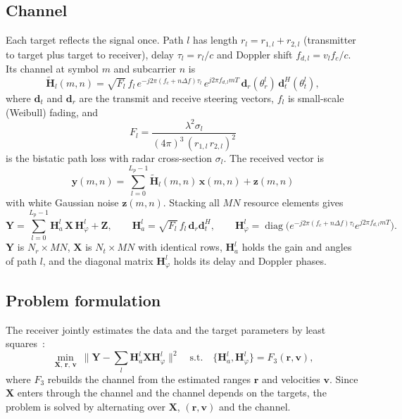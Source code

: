 \documentclass[11pt,a4paper]{article}
\newcommand{\BH}{\mathbf{H}}
\newcommand{\BX}{\mathbf{X}}
\newcommand{\BY}{\mathbf{Y}}
\newcommand{\BZ}{\mathbf{Z}}
\begin{document}
\subsection{Channel}
Each target reflects the signal once. Path $l$ has length $r_l=r_{1,l}+r_{2,l}$ (transmitter to target plus target to receiver), delay $\tau_l=r_l/c$ and Doppler shift $f_{d,l}=v_l f_c/c$. Its channel at symbol $m$ and subcarrier $n$ is
\begin{equation}
  \tilde{\BH}_l(m,n)=\sqrt{F_l}\,f_l\,e^{-j2\pi(f_c+n\Delta f)\tau_l}\,e^{j2\pi f_{d,l} m T}\,\mathbf{d}_r(\theta_r^l)\,\mathbf{d}_t^H(\theta_t^l),
\end{equation}
where $\mathbf{d}_t$ and $\mathbf{d}_r$ are the transmit and receive steering vectors, $f_l$ is small-scale (Weibull) fading, and
\begin{equation}
  F_l=\frac{\lambda^2\sigma_l}{(4\pi)^3\,(r_{1,l}\,r_{2,l})^2}
\end{equation}
is the bistatic path loss with radar cross-section $\sigma_l$. The received vector is
\begin{equation}
  \mathbf{y}(m,n)=\sum_{l=0}^{L_p-1}\tilde{\BH}_l(m,n)\,\mathbf{x}(m,n)+\mathbf{z}(m,n)
\end{equation}
with white Gaussian noise $\mathbf{z}(m,n)$. Stacking all $MN$ resource elements gives~\cite[eq.~(9)]{isacnet}
\begin{equation}
  \BY=\sum_{l=0}^{L_p-1}\BH_a^l\,\BX\,\BH_\varphi^l+\BZ,\qquad
  \BH_a^l=\sqrt{F_l}\,f_l\,\mathbf{d}_r\mathbf{d}_t^H,\qquad
  \BH_\varphi^l=\operatorname{diag}\!\big(e^{-j2\pi(f_c+n\Delta f)\tau_l}e^{j2\pi f_{d,l}mT}\big).
\end{equation}
$\BY$ is $N_r\times MN$, $\BX$ is $N_t\times MN$ with identical rows, $\BH_a^l$ holds the gain and angles of path $l$, and the diagonal matrix $\BH_\varphi^l$ holds its delay and Doppler phases.

\subsection{Problem formulation}
The receiver jointly estimates the data and the target parameters by least squares~\cite[eq.~(18)]{isacnet}:
\begin{equation}
  \min_{\BX,\,\mathbf{r},\,\mathbf{v}}\ \Big\|\BY-\sum_l\BH_a^l\BX\BH_\varphi^l\Big\|^2
  \quad\text{s.t.}\quad\{\BH_a^l,\BH_\varphi^l\}=F_3(\mathbf{r},\mathbf{v}),
\end{equation}
where $F_3$ rebuilds the channel from the estimated ranges $\mathbf{r}$ and velocities $\mathbf{v}$. Since $\BX$ enters through the channel and the channel depends on the targets, the problem is solved by alternating over $\BX$, $(\mathbf{r},\mathbf{v})$ and the channel.
\end{document}
